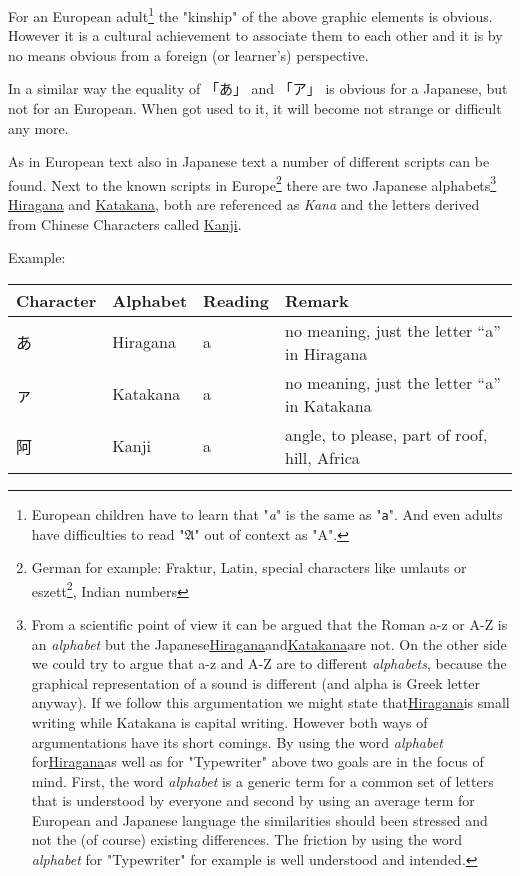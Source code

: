 For an European adult\footnote{European children have to learn that
"\textit{a}" is the same as "\texttt{a}". And even adults have difficulties to
read "$\mathfrak{A}$" out of context as "A".}  the "kinship" of the above
graphic elements is obvious. However it is a cultural achievement to associate
them to each other and it is by no means obvious from a foreign (or learner's)
perspective. 

In a similar way the equality of {「あ」} and {「ア」} is obvious for a
Japanese, but not for an European. When got used to it, it will become not
strange or difficult any more.

As in European text also in Japanese text a number of different scripts can be
found. Next to the known scripts in Europe\footnote{German for example:
Fraktur, Latin, special characters like umlauts or eszett\footnote{the German
symbol for a voiceless "s" after a long vowel (such as in "großer Mann") or a
diphthong (such as in "weißer Hai"). ('ß')}, Indian numbers} there are two
Japanese alphabets\footnote{ From a scientific point of view it can be argued
that the Roman a-z or A-Z is an \textit{alphabet} but the
Japanese\hyperref[sec:Hiragana]{Hiragana}and\hyperref[sec:Katakana]{Katakana}are
not. On the other side we could try to argue that a-z and A-Z are to different
\textit{alphabets}, because the graphical representation of a sound is
different (and alpha is Greek letter anyway). If we follow this argumentation
we might state that\hyperref[sec:Hiragana]{Hiragana}is small writing while
Katakana is capital writing. However both ways of argumentations have its short
comings. By using the word \textit{alphabet}
for\hyperref[sec:Hiragana]{Hiragana}as well as for "Typewriter" above two goals
are in the focus of mind. First, the word \textit{alphabet} is a generic term
for a common set of letters that is understood by everyone and second by using
an average term for European and Japanese language the similarities should been
stressed and not the (of course) existing differences. The friction by using
the word \textit{alphabet} for "Typewriter" for example is well understood and
intended. } \hyperref[sec:Hiragana]{Hiragana} and
\hyperref[sec:Katakana]{Katakana}, both are referenced as \textit{Kana} and the
letters derived from Chinese Characters called \hyperref[sec:Kanji]{Kanji}.

Example:

\begin{center}
\begin{tabular}{|l|l|l|l|}
\textbf{Character}&\textbf{Alphabet}&\textbf{Reading}&\textbf{Remark}\\\hline
あ& Hiragana & a & no meaning, just the letter  ``a'' in Hiragana \\
ァ& Katakana & a & no meaning, just the letter ``a'' in Katakana \\
阿& Kanji    & a & { angle, to please, part of roof, hill, Africa}\\
\end{tabular}
\end{center}

